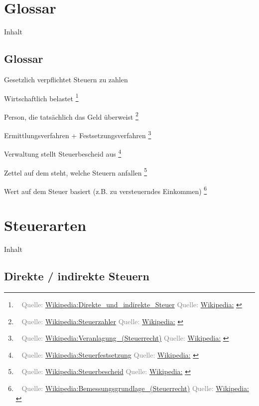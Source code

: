 \documentclass[draft]{beamer}
\let\oldfootnote\footnote
\renewcommand{\footnote}[1]
{%
	\oldfootnote
	{
		\tiny
		\textcolor{gray}{\ #1}
	}%
}
\newcommand{\citewiki}[2][]
{%
	\footnote
	{
		\ifthenelse{\isempty{#1}}
		{
			Quelle: \href{https://de.wikipedia.org/wiki/#2}{Wikipedia:#2}
		}
		{
			Quelle: \href{https://de.wikipedia.org/wiki/#2}{Wikipedia:#1}
		}
	}
}
\begin{document}
	\section{Glossar}
	
		\begin{frame}[t]{Inhalt}
		\end{frame}
		
		\subsection{Glossar}
		
			\begin{frame}
				\begin{description}[labelwidth=0cm]
					\item[Steuerschuldner] Gesetzlich verpflichtet Steuern zu zahlen
					\item[Steuerträger] Wirtschaftlich belastet\citewiki{Direkte\_und\_indirekte\_Steuer}
					\item[Steuerzahler] Person, die tatsächlich das Geld überweist\citewiki{Steuerzahler}
					\item[Veranlagung] Ermittlungsverfahren + Festsetzungsverfahren\citewiki{Veranlagung\_(Steuerrecht)}
					\item[Steuerfestsetzung] Verwaltung stellt Steuerbescheid aus\citewiki{Steuerfestsetzung}
					\item[Steuerbescheid] Zettel auf dem steht, welche Steuern anfallen\citewiki{Steuerbescheid}
					\item[Bemessungsgrundlage] Wert auf dem Steuer basiert (z.B. zu versteuerndes Einkommen)\citewiki{Bemessungsgrundlage\_(Steuerrecht)}
				\end{description}
			\end{frame}
	
	\section{Steuerarten}
	
		\begin{frame}[t]{Inhalt}
		\end{frame}
	
		\subsection{Direkte / indirekte Steuern}
		
\end{document}
